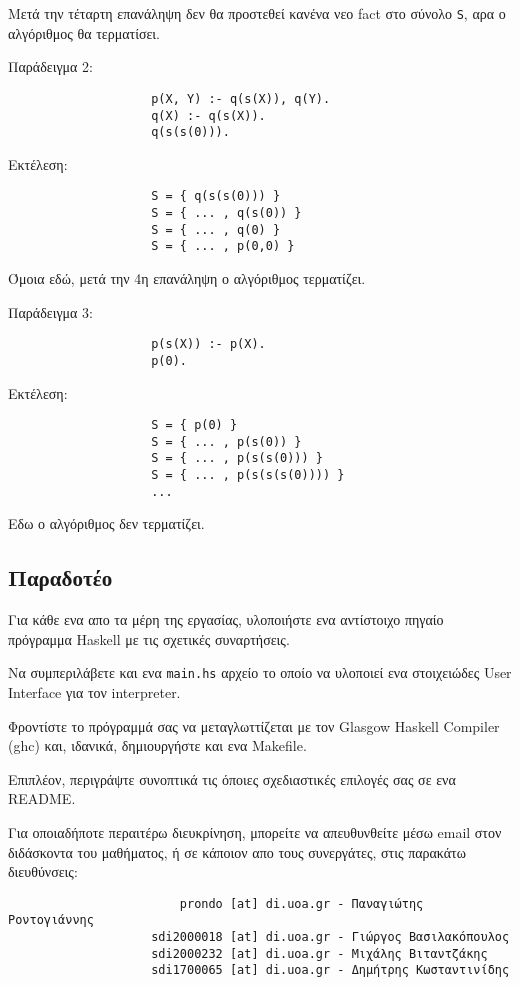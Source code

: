 \documentclass[10pt]{article}
\begin{document}
Μετά την τέταρτη επανάληψη δεν θα προστεθεί κανένα νεο fact στο σύνολο \verb|S|, αρα ο αλγόριθμος θα τερματίσει.





Παράδειγμα 2:
\begin{verbatim}
                    p(X, Y) :- q(s(X)), q(Y).
                    q(X) :- q(s(X)).
                    q(s(s(0))).
\end{verbatim}

Εκτέλεση:
\begin{verbatim}
                    S = { q(s(s(0))) }
                    S = { ... , q(s(0)) }
                    S = { ... , q(0) }
                    S = { ... , p(0,0) }
\end{verbatim}

Όμοια εδώ, μετά την 4η επανάληψη ο αλγόριθμος τερματίζει.




Παράδειγμα 3:
\begin{verbatim}
                    p(s(X)) :- p(X).
                    p(0).
\end{verbatim}

Εκτέλεση:
\begin{verbatim}
                    S = { p(0) }
                    S = { ... , p(s(0)) }
                    S = { ... , p(s(s(0))) }
                    S = { ... , p(s(s(s(0)))) }
                    ...
\end{verbatim}

Εδω ο αλγόριθμος δεν τερματίζει.

\subsection*{Παραδοτέο}

Για κάθε ενα απο τα μέρη της εργασίας, υλοποιήστε ενα αντίστοιχο πηγαίο πρόγραμμα Haskell με τις σχετικές συναρτήσεις. \

Να συμπεριλάβετε και ενα \verb|main.hs| αρχείο το οποίο να υλοποιεί ενα στοιχειώδες User Interface για τον interpreter.\

Φροντίστε το πρόγραμμά σας να μεταγλωττίζεται με τον Glasgow Haskell Compiler (ghc) και, ιδανικά, δημιουργήστε και ενα Makefile.\

Επιπλέον, περιγράψτε συνοπτικά τις όποιες σχεδιαστικές επιλογές σας σε ενα README.\

Για οποιαδήποτε περαιτέρω διευκρίνηση, μπορείτε να απευθυνθείτε μέσω email στον διδάσκοντα του μαθήματος, ή σε κάποιον απο τους συνεργάτες, στις παρακάτω διευθύνσεις:

\begin{verbatim}
                        prondo [at] di.uoa.gr - Παναγιώτης Ροντογιάννης
                    sdi2000018 [at] di.uoa.gr - Γιώργος Βασιλακόπουλος
                    sdi2000232 [at] di.uoa.gr - Μιχάλης Βιταντζάκης
                    sdi1700065 [at] di.uoa.gr - Δημήτρης Κωσταντινίδης
\end{verbatim}
\end{document}
